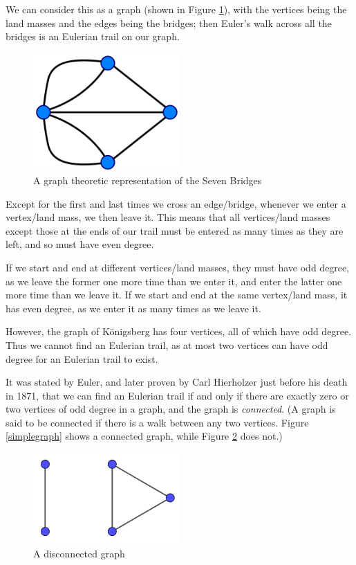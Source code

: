 \documentclass[11pt,a4paper]{report}
\begin{document}
\begin{adjustwidth}{5cm}{5cm}
We can consider this as a graph (shown in Figure \ref{Konigsberggraph}), with the vertices being the land masses and the edges being the bridges; then Euler's walk across all the bridges is an Eulerian trail on our graph.

\begin{figure}[h]
	\centering
	\includegraphics[width=0.5\textwidth]{Konigsberggraph}
	\caption{A graph theoretic representation of the Seven Bridges}
	\label{Konigsberggraph}
\end{figure}

Except for the first and last times we cross an edge/bridge, whenever we enter a vertex/land mass, we then leave it. This means that all vertices/land masses except those at the ends of our trail must be entered as many times as they are left, and so must have even degree.

If we start and end at different vertices/land masses, they must have odd degree, as we leave the former one more time than we enter it, and enter the latter one more time than we leave it. If we start and end at the same vertex/land mass, it has even degree, as we enter it as many times as we leave it.

However, the graph of K\"onigsberg has four vertices, all of which have odd degree. Thus we cannot find an Eulerian trail, as at most two vertices can have odd degree for an Eulerian trail to exist.

It was stated by Euler, and later proven by Carl Hierholzer just before his death in 1871, that we can find an Eulerian trail if and only if there are exactly zero or two vertices of odd degree in a graph, and the graph is \textit{connected}. (A graph is said to be connected if there is a walk between any two vertices. Figure \ref{simplegraph} shows a connected graph, while Figure \ref{disconnectedgraph} does not.)

\begin{figure}[h]
	\centering
	\includegraphics[width=0.5\textwidth]{disconnectedgraph}
	\caption{A disconnected graph}
	\label{disconnectedgraph}
\end{figure}


\end{adjustwidth}
\end{document}
